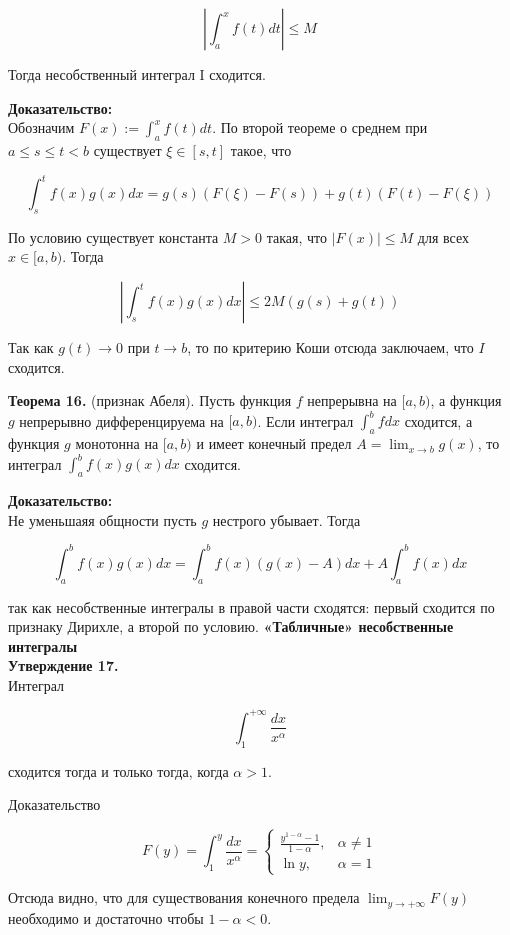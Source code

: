 \documentclass[a4paper,12pt]{article} %
\begin{document}
	$$
	\left|\int_{a}^{x} f(t) d t\right| \leq M
	$$
	
	Тогда несобственный интеграл I сходится.
	
	\textbf{Доказательство:\\}
	Обозначим $F(x):=\int_{a}^{x} f(t) d t$. По второй теореме о среднем при $a \leq s \leq t<b$ существует $\xi \in[s, t]$ такое, что
	
	$$
	\int_{s}^{t} f(x) g(x) d x=g(s)(F(\xi)-F(s))+g(t)(F(t)-F(\xi))
	$$
	
	По условию существует константа $M>0$ такая, что $|F(x)| \leq M$ для всех $x \in[a, b)$. Тогда
	
	$$
	\left|\int_{s}^{t} f(x) g(x) d x\right| \leq 2 M(g(s)+g(t))
	$$
	
	Так как $g(t) \rightarrow 0$ при $t \rightarrow b$, то по критерию Коши отсюда заключаем, что $I$ сходится.
	
	\textbf{Теорема 16.} (признак Абеля). Пусть функция $f$ непрерывна на $[a, b)$, а функция $g$ непрерывно дифференцируема на $[a, b)$. Если интеграл $\int_{a}^{b} f d x$ сходится, а функция $g$ монотонна на $[a, b)$ и имеет конечный предел $A=\lim _{x \rightarrow b} g(x)$, то интеграл $\int_{a}^{b} f(x) g(x) d x$ сходится.
	
	\textbf{Доказательство:\\}
	Не уменьшаяя общности пусть $g$ нестрого убывает. Тогда
	
	$$
	\int_{a}^{b} f(x) g(x) d x=\int_{a}^{b} f(x)(g(x)-A) d x+A \int_{a}^{b} f(x) d x
	$$
	
	так как несобственные интегралы в правой части сходятся: первый сходится по признаку Дирихле, а второй по условию.
\newline
	\textbf{«Табличные» несобственные интегралы}\\
	\textbf{Утверждение 17.}\\ 
	
	Интеграл
	
	$$
	\int_{1}^{+\infty} \frac{d x}{x^{\alpha}}
	$$
	
	сходится тогда и только тогда, когда $\alpha>1$.
	
	Доказательство
	
	$$
	F(y)=\int_{1}^{y} \frac{d x}{x^{\alpha}}= \begin{cases}\frac{y^{1-\alpha}-1}{1-\alpha}, & \alpha \neq 1 \\ \ln y, & \alpha=1\end{cases}
	$$
	
	Отсюда видно, что для существования конечного предела $\lim _{y \rightarrow+\infty} F(y)$ необходимо и достаточно чтобы $1-\alpha<0$.
	
\end{document}
